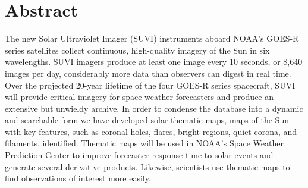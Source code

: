 \documentclass[twoside]{report}
\begin{document}
\tableofcontents
\listoffigures
\listoftables
\onehalfspacing
\chapter*{Abstract}

The new Solar Ultraviolet Imager (SUVI) instruments aboard NOAA’s GOES-R series satellites collect continuous, high-quality imagery of the Sun in six wavelengths. SUVI imagers produce at least one image every 10 seconds, or 8,640 images per day, considerably more data than observers can digest in real time. Over the projected 20-year lifetime of the four GOES-R series spacecraft, SUVI will provide critical imagery for space weather forecasters and produce an extensive but unwieldy archive. In order to condense the database into a dynamic and searchable form we have developed solar thematic maps, maps of the Sun with key features, such as coronal holes, flares, bright regions, quiet corona, and filaments, identified. Thematic maps will be used in NOAA’s Space Weather Prediction Center to improve forecaster response time to solar events and generate several derivative products. Likewise, scientists use thematic maps to find observations of interest more easily.
\end{document}
